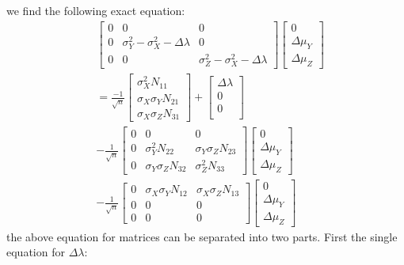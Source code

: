 \documentclass[12pt]{amsart}
\theoremstyle{definition}
\numberwithin{equation}{section}
\numberwithin{equation}{section}
\theoremstyle{remark}
\numberwithin{equation}{section}
\begin{document}
we find the following exact equation:
\begin{align*}
\label{zaza3}
&\left[
\begin{array}{ccccccccc}
0&0&0\\
0&\sigma_Y^2-\sigma_X^2-\Delta\lambda&0\\
0&0&\sigma_Z^2-\sigma_X^2-\Delta\lambda
\end{array}
\right]
\left[\begin{array}{c}
0\\
\Delta\mu_Y\\
\Delta\mu_Z
\end{array}\right]\\
&=
\frac{-1}{\sqrt{n}}
\left[
\begin{array}{c}
\sigma^{2}_{X}N_{11}\\
\sigma_X\sigma_Y N_{21}\\
\sigma_X\sigma_Z N_{31}
\end{array}
\right]+
\left[
\begin{array}{c}
\Delta\lambda\\
0\\
0\\
\end{array}
\right]\\
&-
\frac{1}{\sqrt{n}}\left[
\begin{array}{ccccccccc}
0&0&0\\
0&\sigma^{2}_{Y} N_{22}&\sigma_Y\sigma_Z N_{23}\\
0&\sigma_Y\sigma_Z N_{32}&\sigma^{2}_{Z}N_{33}
\end{array}\right]
\left[
\begin{array}{c}
0\\
\Delta\mu_Y\\
\Delta\mu_Z
\end{array}
\right]\\
&-\frac{1}{\sqrt{n}}\left[
\begin{array}{ccccccccc}
0&\sigma_X\sigma_Y N_{12}&\sigma_X\sigma_Z N_{13}\\
0&0&0\\
0&0&0
\end{array}\right]
\left[
\begin{array}{c}
0\\
\Delta\mu_Y\\
\Delta\mu_Z
\end{array}
\right]
\end{align*}
the above equation for matrices can be separated into two parts. First the single equation for $\Delta\lambda$:
\end{document}
